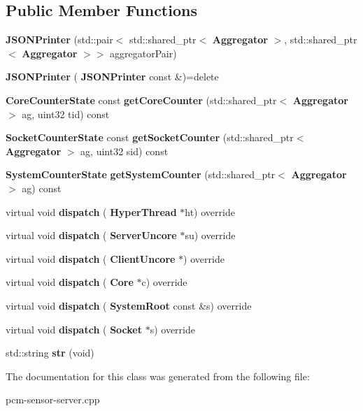\subsection*{Public Member Functions}
\begin{DoxyCompactItemize}
\item 
\mbox{\label{classJSONPrinter_a2476ff15e6bbd00e81c222404d59e257}} 
{\bfseries J\+S\+O\+N\+Printer} (std\+::pair$<$ std\+::shared\+\_\+ptr$<$ \textbf{ Aggregator} $>$, std\+::shared\+\_\+ptr$<$ \textbf{ Aggregator} $>$$>$ aggregator\+Pair)
\item 
\mbox{\label{classJSONPrinter_ad7d19174c7aa7dac06789398eccfdeb9}} 
{\bfseries J\+S\+O\+N\+Printer} (\textbf{ J\+S\+O\+N\+Printer} const \&)=delete
\item 
\mbox{\label{classJSONPrinter_a86bafcd4de3fb9adcd5aa835a10b4d81}} 
\textbf{ Core\+Counter\+State} const {\bfseries get\+Core\+Counter} (std\+::shared\+\_\+ptr$<$ \textbf{ Aggregator} $>$ ag, uint32 tid) const
\item 
\mbox{\label{classJSONPrinter_a0e4fc58c8ad820006a0646977e0de7f8}} 
\textbf{ Socket\+Counter\+State} const {\bfseries get\+Socket\+Counter} (std\+::shared\+\_\+ptr$<$ \textbf{ Aggregator} $>$ ag, uint32 sid) const
\item 
\mbox{\label{classJSONPrinter_a278e7857f715d48431c63cb57b3c1dad}} 
\textbf{ System\+Counter\+State} {\bfseries get\+System\+Counter} (std\+::shared\+\_\+ptr$<$ \textbf{ Aggregator} $>$ ag) const
\item 
\mbox{\label{classJSONPrinter_a4e2cc8389ac3b97153c0be7bc65b2097}} 
virtual void {\bfseries dispatch} (\textbf{ Hyper\+Thread} $\ast$ht) override
\item 
\mbox{\label{classJSONPrinter_a969e9b144e1c6ed4dcedbdf21e601ae1}} 
virtual void {\bfseries dispatch} (\textbf{ Server\+Uncore} $\ast$su) override
\item 
\mbox{\label{classJSONPrinter_add94d9617aba2568922d46af6a4701f5}} 
virtual void {\bfseries dispatch} (\textbf{ Client\+Uncore} $\ast$) override
\item 
\mbox{\label{classJSONPrinter_ae9891e829417f83f59ea15a41401b77d}} 
virtual void {\bfseries dispatch} (\textbf{ Core} $\ast$c) override
\item 
\mbox{\label{classJSONPrinter_a24484a776374d68900a29ce9d8a949a7}} 
virtual void {\bfseries dispatch} (\textbf{ System\+Root} const \&s) override
\item 
\mbox{\label{classJSONPrinter_af18d22846ea38cd6354aebb24fe4b333}} 
virtual void {\bfseries dispatch} (\textbf{ Socket} $\ast$s) override
\item 
\mbox{\label{classJSONPrinter_aae7cd8d6fd4a1708233edacf62aac51d}} 
std\+::string {\bfseries str} (void)
\end{DoxyCompactItemize}


The documentation for this class was generated from the following file\+:\begin{DoxyCompactItemize}
\item 
pcm-\/sensor-\/server.\+cpp\end{DoxyCompactItemize}
